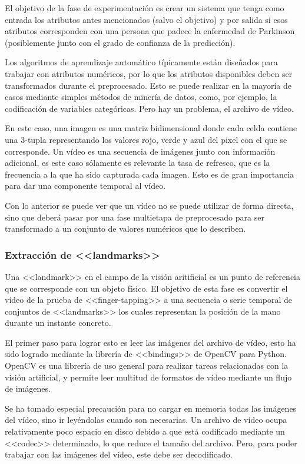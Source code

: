 El objetivo de la fase de experimentación es crear un sistema que tenga como
entrada los atributos antes mencionados (salvo el objetivo) y por salida si esos
atributos corresponden con una persona que padece la enfermedad de Parkinson
(posiblemente junto con el grado de confianza de la predicción).

Los algoritmos de aprendizaje automático típicamente están diseñados para
trabajar con atributos numéricos, por lo que los atributos disponibles deben ser
transformados durante el preprocesado. Esto se puede realizar en la mayoría de
casos mediante simples métodos de minería de datos, como, por ejemplo, la
codificación de variables categóricas. Pero hay un problema, el archivo de
vídeo.

En este caso, una imagen es una matriz bidimensional donde cada celda contiene
una 3-tupla representando los valores rojo, verde y azul del pixel con el que se
corresponde. Un vídeo es una secuencia de imágenes junto con información
adicional, es este caso sólamente es relevante la tasa de refresco, que es la
frecuencia a la que ha sido capturada cada imagen. Esto es de gran importancia
para dar una componente temporal al vídeo.

Con lo anterior se puede ver que un vídeo no se puede utilizar de forma directa,
sino que deberá pasar por una fase multietapa de preprocesado para ser
transformado a un conjunto de valores numéricos que lo describen.

\subsubsection{Extracción de <<landmarks>>}

Una <<landmark>> en el campo de la visión aritificial es un punto de referencia
que se corresponde con un objeto físico. El objetivo de esta fase es convertir
el vídeo de la prueba de <<finger-tapping>> a una secuencia o serie temporal de
conjuntos de <<landmarks>> los cuales representan la posición de la mano durante
un instante concreto.

El primer paso para lograr esto es leer las imágenes del archivo de vídeo, esto
ha sido logrado mediante la librería de <<bindings>> de OpenCV para Python.
OpenCV es una librería de uso general para realizar tareas relacionadas con la
visión artificial, y permite leer multitud de formatos de vídeo mediante un
flujo de imágenes.

Se ha tomado especial precaución para no cargar en memoria todas las imágenes
del vídeo, sino ir leyéndolas cuando son necesarias. Un archivo de vídeo ocupa
relativamente poco espacio en disco debido a que está codificado mediante un
<<codec>> determinado, lo que reduce el tamaño del archivo. Pero, para poder
trabajar con las imágenes del vídeo, este debe ser decodificado.

